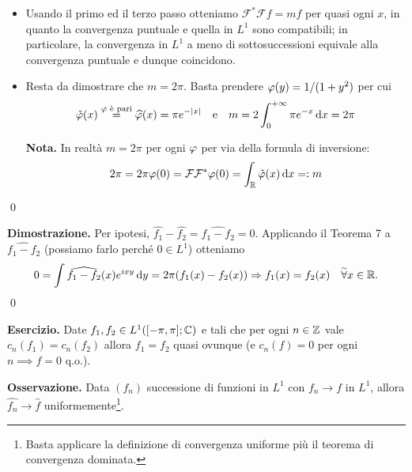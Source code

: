 \begin{itemize}
	\item {} Usando il primo ed il terzo passo otteniamo $\mathcal F^* \mathcal F f = m f$ per quasi ogni $x$, in quanto la convergenza puntuale e quella in $L^1$ sono compatibili; in particolare, la convergenza in $L^1$ a meno di sottosuccessioni equivale alla convergenza puntuale e dunque coincidono.

	\item {} Resta da dimostrare che $m = 2\pi$. 
	Basta prendere $\varphi(y) = 1/(1+y^2)$ per cui
	$$
	\check{\varphi}(x) \overset{\varphi \text{ è pari}}{=} \widehat{\varphi}(x) = \pi e^{-|x|} 
	\quad \text{e} \quad 
	m = 2 \int_0^{+\infty} \pi e^{-x} \,\mathrm{d} x = 2\pi
	$$

	\textbf{Nota.} In realtà $m = 2\pi$ per ogni $\varphi$ per via della formula di inversione:
	$$
		2\pi = 2\pi \varphi(0) = \mathcal{F} \mathcal{F}^\ast \varphi(0) = \int_{\mathbb R} \check{\varphi}(x) \,\mathrm{d} x =: m
	$$
	
\end{itemize}
\qed


\textbf{Dimostrazione.} Per ipotesi, $\hat{f_1} - \hat{f_2} = \hat{f_1 - f_2} = 0$.
Applicando il Teorema 7 a $\hat{f_1 - f_2}$ (possiamo farlo perché $0 \in L^1$) otteniamo
%
$$
	0 = \int \widehat{f_1 - f_2}(x) e^{ixy} \,\mathrm{d} y = 2\pi (f_1(x) - f_2(x)) 
	\Rightarrow f_1(x) = f_2(x) \quad \widetilde\forall x \in \mathbb R.
$$
%
\qed


\textbf{Esercizio.}
Date $f_1, f_2 \in L^1([-\pi, \pi]; \mathbb C)$ e tali che per ogni $n \in \mathbb Z$ vale $c_n(f_1) = c_n(f_2)$ allora $f_1 = f_2$ quasi ovunque (e $c_n(f) = 0$ per ogni $n \implies f = 0$ q.o.).

\textbf{Osservazione.} Data $(f_n)$ successione di funzioni in $L^1$ con $f_n \to f$ in $L^1$, allora $\hat{f_n} \to \hat{f}$ uniformemente\footnote{Basta applicare la definizione di convergenza uniforme più il teorema di convergenza dominata.}. 









